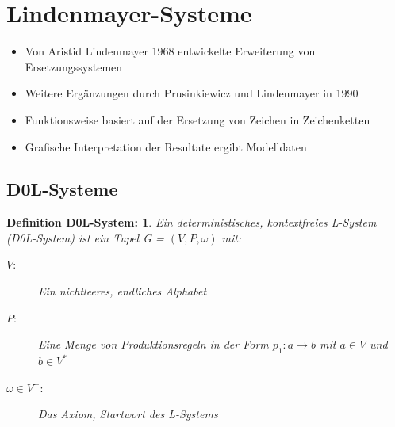 
\newpage
\slidetitle{}
\section{Lindenmayer-Systeme \\}

\begin{itemize}
	\item Von Aristid Lindenmayer 1968 entwickelte Erweiterung von Ersetzungssystemen \\
	
	\item Weitere Ergänzungen durch Prusinkiewicz und Lindenmayer in 1990\\
	
	\item Funktionsweise basiert auf der Ersetzung von Zeichen in Zeichenketten \\
	
	\item Grafische Interpretation der Resultate ergibt Modelldaten
	
\end{itemize}





\newpage
{}

\subsection{D0L-Systeme\\ }
\newtheorem{defD0LSystem}{Definition D0L-System:}[subsection]
\begin{defD0LSystem}
	Ein deterministisches, kontextfreies L-System (D0L-System) ist ein Tupel G = $(V, P, \omega)$ mit:
	
	\begin{description}
		\item[\boldmath$V:$ ] Ein nichtleeres, endliches Alphabet\\
		
		\item[\boldmath$P:$ ] Eine Menge von Produktionsregeln in der Form $p_1: a \rightarrow b$ mit $a \in V$ und $b \in V^*$ \\
		
		\item[\boldmath$\omega \in V^+ :$ ]  Das Axiom, Startwort des L-Systems		
	\end{description}
\end{defD0LSystem}





